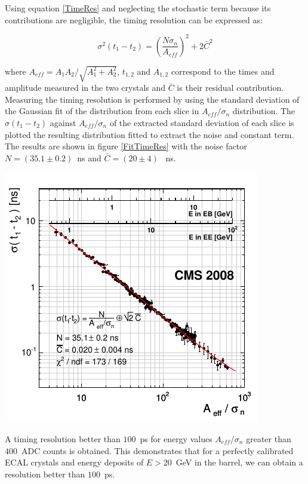 Using equation \eqref{TimeRes} and neglecting the stochastic term because its contributions are negligible, the timing resolution can be expressed as:
 
 \begin{equation}\label{ResTime}
 \sigma^{2}(t_{1} - t_{2}) = \left(\frac{N\sigma_{n}}{A_{eff}}\right)^{2} + 2\bar{C}^{2}
 \end{equation}
 
 where $A_{eff} = A_{1}A_{2}/\sqrt{A^{2}_{1} + A^{2}_{2}}$, $t_{1,2}$ and $A_{1,2}$ correspond to the times and amplitude measured in the two crystals and $\bar{C}$ is their residual contribution.
Measuring the timing resolution is performed by using the standard deviation of the Gaussian fit of the distribution from each slice in $A_{eff}/\sigma_{n}$ distribution. The $\sigma(t_{1} - t_{2})$ against $A_{eff}/\sigma_{n}$ of the extracted standard deviation of each slice is plotted the resulting distribution fitted to extract the noise and constant term. The results are shown in figure \eqref{FitTimeRes} with the noise factor $N = (35.1 \pm 0.2)$~ns and $\bar{C} = (20 \pm 4)$ ~ns. 

\begin{center}\label{fittimeRes}
\centering
\mbox{\includegraphics[scale=0.8]{THESISPLOTS/ECAL_Timing_Resolution.png}}
\label{fig:FitTimeRes}
\end{center}
A timing resolution better than $100$~ps for energy values $A_{eff}/\sigma_{n}$ greater than $400$~ADC counts is obtained. This demonstrates that for a perfectly calibrated ECAL crystals and energy deposits of $E > 20$~GeV in the barrel, we can obtain a resolution better than $100$~ps. 

